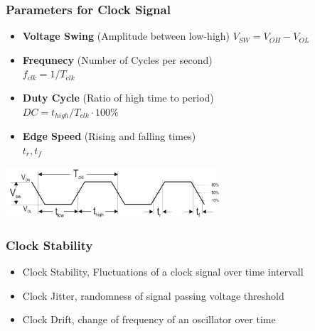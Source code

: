 \subsubsection{Parameters for Clock Signal}
\begin{minipage}{9cm}
	\begin{itemize}
		\item \textbf{Voltage Swing} (Amplitude between low-high) $V_{SW}=V_{OH}-V_{OL}$
		\item \textbf{Frequnecy} (Number of Cycles per second) \\$f_{clk}=1/T_{clk}$
		\item \textbf{Duty Cycle} (Ratio of high time to period)\\ $DC=t_{high}/T_{clk} \cdot 100 \%$
		\item \textbf{Edge Speed} (Rising and falling times)\\$t_r, t_f$
	\end{itemize}
\end{minipage}
\begin{minipage}{8cm}
	\includegraphics[width=8cm]{images/clock_parameters.png}
\end{minipage}
\subsubsection{Clock Stability}
\begin{itemize}
	\item Clock Stability, Fluctuations of a clock signal over time intervall
	\item Clock Jitter, randomness of signal passing voltage threshold
	\item Clock Drift, change of frequency of an oscillator over time
\end{itemize}
\clearpage
\pagebreak